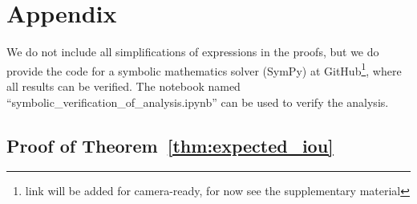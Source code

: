\section{Appendix}
\label{app:appendix}

We do not include all simplifications of expressions in the proofs, but we do provide the code for a symbolic mathematics solver (SymPy) at GitHub\footnote{link will be added for camera-ready, for now see the supplementary material}, where all results can be verified. The notebook named ``symbolic\_verification\_of\_analysis.ipynb'' can be used to verify the analysis. 




\subsection{Proof of Theorem~\ref{thm:expected_iou}}
\label{app:proof_of_theorem}





